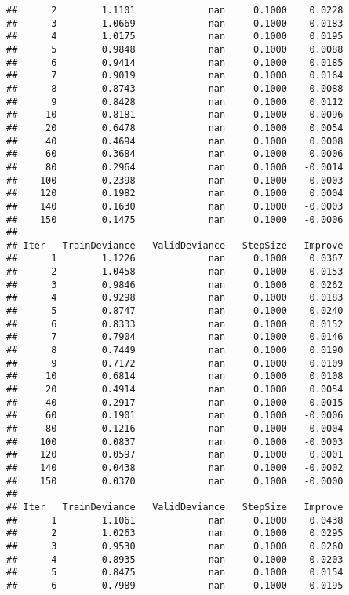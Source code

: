 \documentclass[]{article}
\begin{document}
\begin{verbatim}
##      2        1.1101             nan     0.1000    0.0228
##      3        1.0669             nan     0.1000    0.0183
##      4        1.0175             nan     0.1000    0.0195
##      5        0.9848             nan     0.1000    0.0088
##      6        0.9414             nan     0.1000    0.0185
##      7        0.9019             nan     0.1000    0.0164
##      8        0.8743             nan     0.1000    0.0088
##      9        0.8428             nan     0.1000    0.0112
##     10        0.8181             nan     0.1000    0.0096
##     20        0.6478             nan     0.1000    0.0054
##     40        0.4694             nan     0.1000    0.0008
##     60        0.3684             nan     0.1000    0.0006
##     80        0.2964             nan     0.1000   -0.0014
##    100        0.2398             nan     0.1000    0.0003
##    120        0.1982             nan     0.1000    0.0004
##    140        0.1630             nan     0.1000   -0.0003
##    150        0.1475             nan     0.1000   -0.0006
## 
## Iter   TrainDeviance   ValidDeviance   StepSize   Improve
##      1        1.1226             nan     0.1000    0.0367
##      2        1.0458             nan     0.1000    0.0153
##      3        0.9846             nan     0.1000    0.0262
##      4        0.9298             nan     0.1000    0.0183
##      5        0.8747             nan     0.1000    0.0240
##      6        0.8333             nan     0.1000    0.0152
##      7        0.7904             nan     0.1000    0.0146
##      8        0.7449             nan     0.1000    0.0190
##      9        0.7172             nan     0.1000    0.0109
##     10        0.6814             nan     0.1000    0.0108
##     20        0.4914             nan     0.1000    0.0054
##     40        0.2917             nan     0.1000   -0.0015
##     60        0.1901             nan     0.1000   -0.0006
##     80        0.1216             nan     0.1000    0.0004
##    100        0.0837             nan     0.1000   -0.0003
##    120        0.0597             nan     0.1000    0.0001
##    140        0.0438             nan     0.1000   -0.0002
##    150        0.0370             nan     0.1000   -0.0000
## 
## Iter   TrainDeviance   ValidDeviance   StepSize   Improve
##      1        1.1061             nan     0.1000    0.0438
##      2        1.0263             nan     0.1000    0.0295
##      3        0.9530             nan     0.1000    0.0260
##      4        0.8935             nan     0.1000    0.0203
##      5        0.8475             nan     0.1000    0.0154
##      6        0.7989             nan     0.1000    0.0195

\end{verbatim}
\end{document}
